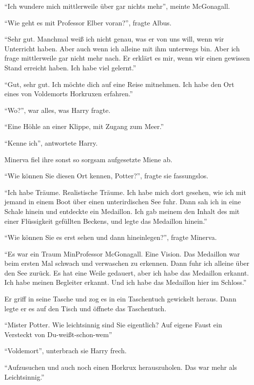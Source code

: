 \enquote{Ich wundere mich mittlerweile über gar nichts mehr}, meinte McGonagall.

\enquote{Wie geht es mit Professor Elber voran?}, fragte Albus.

\enquote{Sehr gut. Manchmal weiß ich nicht genau, was er von uns will, wenn wir Unterricht haben. Aber auch wenn ich alleine mit ihm unterwegs bin. Aber ich frage mittlerweile gar nicht mehr nach. Er erklärt es mir, wenn wir einen gewissen Stand erreicht haben. Ich habe viel gelernt.}

\enquote{Gut, sehr gut. Ich möchte dich auf eine Reise mitnehmen. Ich habe den Ort eines von Voldemorts Horkruxen erfahren.}

\enquote{Wo?}, war alles, was Harry fragte.

\enquote{Eine Höhle an einer Klippe, mit Zugang zum Meer.}

\enquote{Kenne ich}, antwortete Harry.

Minerva fiel ihre sonst so sorgsam aufgesetzte Miene ab.

\enquote{Wie können Sie diesen Ort kennen, Potter?}, fragte sie fassungslos.

\enquote{Ich habe Träume. Realistische Träume. Ich habe mich dort gesehen, wie ich mit jemand in einem Boot über einen unterirdischen See fuhr. Dann sah ich in eine Schale hinein und entdeckte ein Medaillon. Ich gab meinem  den Inhalt des mit einer Flüssigkeit gefüllten Beckens, und legte das Medaillon hinein.}

\enquote{Wie können Sie es erst sehen und dann hineinlegen?}, fragte Minerva.

\enquote{Es war ein Traum Min\abs Professor McGonagall. Eine Vision. Das Medaillon war beim ersten Mal schwach und verwaschen zu erkennen. \gst Dann fuhr ich alleine über den See zurück. \gst Es hat eine Weile gedauert, aber ich habe das Medaillon erkannt. Ich habe meinen Begleiter erkannt. Und ich habe das Medaillon hier im Schloss.}

Er griff in seine Tasche und zog es in ein Taschentuch gewickelt heraus. Dann legte er es auf den Tisch und öffnete das Taschentuch.

\enquote{Mister Potter. Wie leichtsinnig sind Sie eigentlich? Auf eigene Faust ein Versteckt von Du-weißt-schon-wem\abs}

\enquote{Voldemort}, unterbrach sie Harry frech.

\enquote{\aabs Aufzusuchen und auch noch einen Horkrux herauszuholen. Das war mehr als Leichtsinnig.}

